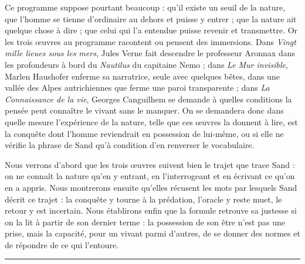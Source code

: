 \documentclass[11pt,a4paper]{article}
\begin{document}
Ce programme suppose pourtant beaucoup : qu'il existe un seuil de la nature, que l'homme se tienne d'ordinaire au dehors et puisse y entrer ; que la nature ait quelque chose à dire ; que celui qui l'a entendue puisse revenir et transmettre. Or les trois œuvres au programme racontent ou pensent des immersions. Dans \emph{Vingt mille lieues sous les mers}, Jules Verne fait descendre le professeur Aronnax dans les profondeurs à bord du \emph{Nautilus} du capitaine Nemo ; dans \emph{Le Mur invisible}, Marlen Haushofer enferme sa narratrice, seule avec quelques bêtes, dans une vallée des Alpes autrichiennes que ferme une paroi transparente ; dans \emph{La Connaissance de la vie}, Georges Canguilhem se demande à quelles conditions la pensée peut connaître le vivant sans le manquer. On se demandera donc dans quelle mesure l'expérience de la nature, telle que ces œuvres la donnent à lire, est la conquête dont l'homme reviendrait en possession de lui-même, ou si elle ne vérifie la phrase de Sand qu'à condition d'en renverser le vocabulaire.

Nous verrons d'abord que les trois œuvres suivent bien le trajet que trace Sand : on ne connaît la nature qu'en y entrant, en l'interrogeant et en écrivant ce qu'on en a appris. Nous montrerons ensuite qu'elles récusent les mots par lesquels Sand décrit ce trajet : la conquête y tourne à la prédation, l'oracle y reste muet, le retour y est incertain. Nous établirons enfin que la formule retrouve sa justesse si on la lit à partir de son dernier terme : la possession de son être n'est pas une prise, mais la capacité, pour un vivant parmi d'autres, de se donner des normes et de répondre de ce qui l'entoure.

\begin{center}\rule{0.5\linewidth}{0.5pt}\end{center}
\end{document}
